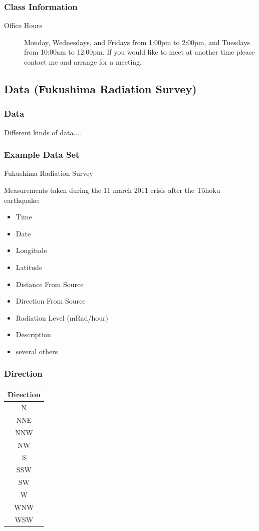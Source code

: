 \begin{frame}
  \frametitle{Class Information}

\begin{description}
  \item[Office Hours] Monday, Wednesdays, and Fridays from 1:00pm to
    2:00pm, and Tuesdays from 10:00am to 12:00pm.  If you would like
    to meet at another time please contact me and arrange for a
    meeting.

\end{description}


\end{frame}

\subsection{Data (Fukushima Radiation Survey)}

\begin{frame}
  \frametitle{Data}

  Different kinds of data....


\end{frame}

\begin{frame}
  \frametitle{Example Data Set}

  Fukushima Radiation Survey

  Measurements taken during the 11 march 2011 crisis after the
  T\={o}hoku earthquake:
  \begin{itemize}
  \item Time
  \item Date
  \item Longitude
  \item Latitude
  \item Distance From Source
  \item Direction From Source
  \item Radiation Level (mRad/hour)
  \item Description
  \item several others
  \end{itemize}

\end{frame}



\begin{frame}
  \frametitle{Direction}

  \begin{tabular}{c}
    Direction \\ \hline 
    N   \\
    NNE  \\
    NNW  \\
    NW  \\
    S  \\
    SSW \\
    SW  \\
    W  \\
    WNW  \\
    WSW 
  \end{tabular}

\end{frame}

